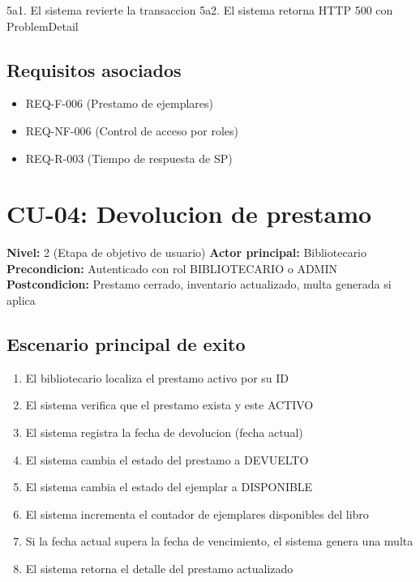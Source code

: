 \documentclass[
11pt,
a4paper,
]{report}
\providecommand{\tightlist}{%
	\setlength{\itemsep}{0pt}\setlength{\parskip}{0pt}}
\begin{document}
	5a1. El sistema revierte la transaccion
	5a2. El sistema retorna HTTP 500 con ProblemDetail
	
	\hypertarget{requisitos-asociados-2}{%
		\subsection{Requisitos asociados}\label{requisitos-asociados-2}}
	
	\begin{itemize}
		\tightlist
		\item
		REQ-F-006 (Prestamo de ejemplares)
		\item
		REQ-NF-006 (Control de acceso por roles)
		\item
		REQ-R-003 (Tiempo de respuesta de SP)
	\end{itemize}
	
	\hypertarget{cu-04-devolucion-de-prestamo}{%
		\section{CU-04: Devolucion de prestamo}\label{cu-04-devolucion-de-prestamo}}
	
	\textbf{Nivel:} 2 (Etapa de objetivo de usuario)
	\textbf{Actor principal:} Bibliotecario
	\textbf{Precondicion:} Autenticado con rol BIBLIOTECARIO o ADMIN
	\textbf{Postcondicion:} Prestamo cerrado, inventario actualizado, multa generada si aplica
	
	\hypertarget{escenario-principal-de-exito-1}{%
		\subsection{Escenario principal de exito}\label{escenario-principal-de-exito-1}}
	
	\begin{enumerate}
		\def\labelenumi{\arabic{enumi}.}
		\tightlist
		\item
		El bibliotecario localiza el prestamo activo por su ID
		\item
		El sistema verifica que el prestamo exista y este ACTIVO
		\item
		El sistema registra la fecha de devolucion (fecha actual)
		\item
		El sistema cambia el estado del prestamo a DEVUELTO
		\item
		El sistema cambia el estado del ejemplar a DISPONIBLE
		\item
		El sistema incrementa el contador de ejemplares disponibles del libro
		\item
		Si la fecha actual supera la fecha de vencimiento, el sistema genera una multa
		\item
		El sistema retorna el detalle del prestamo actualizado
	\end{enumerate}
	
\end{document}
